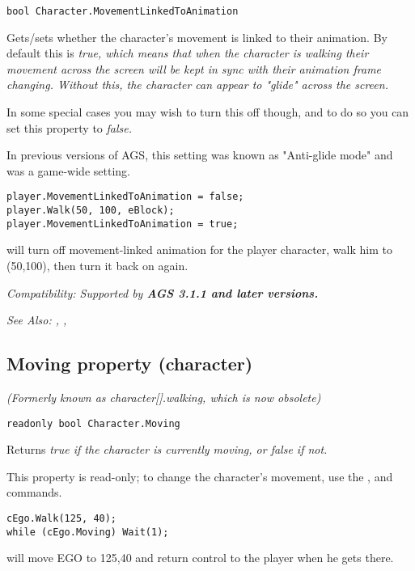 \begin{verbatim}
bool Character.MovementLinkedToAnimation
\end{verbatim}
Gets/sets whether the character's movement is linked to their animation. By default
this is \it{true}, which means that when the character is walking their movement across
the screen will be kept in sync with their animation frame changing. Without this, the
character can appear to "glide" across the screen.

In some special cases you may wish to turn this off though, and to do so you can set this
property to \it{false}.

In previous versions of AGS, this setting was known as "Anti-glide mode" and was a game-wide
setting.

\begin{verbatim}
player.MovementLinkedToAnimation = false;
player.Walk(50, 100, eBlock);
player.MovementLinkedToAnimation = true;
\end{verbatim}
will turn off movement-linked animation for the player character, walk him to (50,100),
then turn it back on again.

\it{Compatibility:} Supported by \bf{AGS 3.1.1} and later versions.

\it{See Also:}
,
,


\subsection{Moving property (character)}\label{Character.Moving}%

\it{(Formerly known as character[].walking, which is now obsolete)}

\begin{verbatim}
readonly bool Character.Moving
\end{verbatim}
Returns \it{true} if the character is currently moving, or \it{false} if not.

This property is read-only; to change the character's movement, use the ,
 and  commands.

\begin{verbatim}
cEgo.Walk(125, 40);
while (cEgo.Moving) Wait(1);
\end{verbatim}
will move EGO to 125,40 and return control to the player when he gets there.

